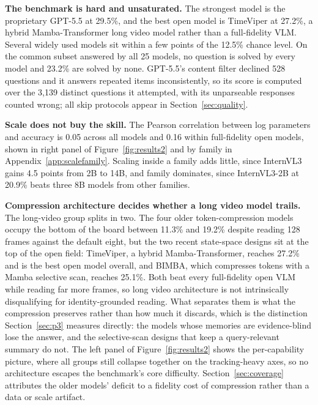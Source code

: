\documentclass{article}
\newcommand{\nummodels}{25}
\newcommand{\chance}{12.5\%}
\begin{document}
\textbf{The benchmark is hard and unsaturated.} The strongest model is the proprietary GPT-5.5 at 29.5\%, and the best open model is TimeViper at 27.2\%, a hybrid Mamba-Transformer long video model rather than a full-fidelity VLM. Several widely used models sit within a few points of the \chance{} chance level. On the common subset answered by all \nummodels{} models, no question is solved by every model and 23.2\% are solved by none. GPT-5.5's content filter declined 528 questions and it answers repeated items inconsistently, so its score is computed over the 3{,}139 distinct questions it attempted, with its unparseable responses counted wrong; all skip protocols appear in Section~\ref{sec:quality}.

\textbf{Scale does not buy the skill.} The Pearson correlation between log parameters and accuracy is 0.05 across all models and 0.16 within full-fidelity open models, shown in right panel of Figure~\ref{fig:results2} and by family in Appendix~\ref{app:scalefamily}. Scaling inside a family adds little, since InternVL3 gains 4.5 points from 2B to 14B, and family dominates, since InternVL3-2B at 20.9\% beats three 8B models from other families.

\textbf{Compression architecture decides whether a long video model trails.} The long-video group splits in two. The four older token-compression models occupy the bottom of the board between 11.3\% and 19.2\% despite reading 128 frames against the default eight, but the two recent state-space designs sit at the top of the open field: TimeViper, a hybrid Mamba-Transformer, reaches 27.2\% and is the best open model overall, and BIMBA, which compresses tokens with a Mamba selective scan, reaches 25.1\%. Both beat every full-fidelity open VLM while reading far more frames, so long video architecture is not intrinsically disqualifying for identity-grounded reading. What separates them is what the compression preserves rather than how much it discards, which is the distinction Section~\ref{sec:p3} measures directly: the models whose memories are evidence-blind lose the answer, and the selective-scan designs that keep a query-relevant summary do not. The left panel of Figure~\ref{fig:results2} shows the per-capability picture, where all groups still collapse together on the tracking-heavy axes, so no architecture escapes the benchmark's core difficulty. Section~\ref{sec:coverage} attributes the older models' deficit to a fidelity cost of compression rather than a data or scale artifact.
\end{document}
